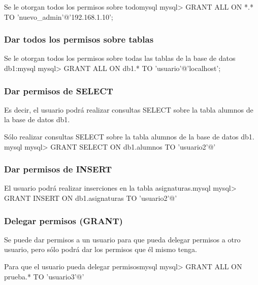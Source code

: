 \begin{mycode}{Se le otorgan todos los permisos sobre todo}{mysql}{}
mysql> GRANT ALL ON *.* TO 'nuevo_admin'@'192.168.1.10';
\end{mycode}


\subsubsection*{Dar todos los permisos sobre tablas}

\begin{mycode}{Se le otorgan todos los permisos sobre todas las tablas de la base de datos db1:}{mysql}{}
mysql> GRANT ALL ON db1.* TO 'usuario'@'localhost';
\end{mycode}


\subsubsection*{Dar permisos de SELECT}

Es decir, el usuario podrá realizar consultas SELECT sobre la tabla alumnos de la base de datos db1.

\begin{mycode}{Sólo realizar consultas SELECT sobre la tabla alumnos de la base de datos db1.
    }{mysql}{}
mysql> GRANT SELECT ON db1.alumnos TO 'usuario2'@'%
\end{mycode}


\subsubsection*{Dar permisos de INSERT}

\begin{mycode}{El usuario podrá realizar inserciones en la tabla asignaturas.}{mysql}{}
mysql> GRANT INSERT ON db1.asignaturas TO 'usuario2'@'%
\end{mycode}


\subsubsection*{Delegar permisos (GRANT)}

Se puede dar permisos a un usuario para que pueda delegar permisos a otro usuario, pero sólo podrá dar los permisos que él mismo tenga.

\begin{mycode}{Para que el usuario pueda delegar permisos}{mysql}{}
mysql> GRANT ALL ON prueba.* TO 'usuario3'@'%
\end{mycode}



